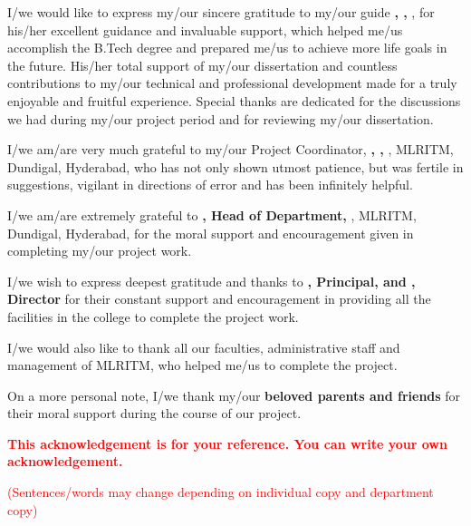 \begin{acknowledgment}
    I/we would like to express my/our sincere gratitude to my/our guide 
    \textbf{\guide, \guideDesignation, \deptName}, for his/her excellent guidance and invaluable support, which helped me/us accomplish the B.Tech degree and prepared me/us to achieve more life goals in the future. His/her total support of my/our dissertation and countless contributions to my/our technical and professional development made for a truly enjoyable and fruitful experience. Special thanks are dedicated for the discussions we had during my/our project period and for reviewing my/our dissertation.
    
    I/we am/are very much grateful to my/our Project Coordinator, 
    \textbf{\supervisor, \supervisorDesignation, \deptName}, MLRITM, Dundigal, Hyderabad, who has not only shown utmost patience, but was fertile in suggestions, vigilant in directions of error and has been infinitely helpful.
    
    I/we am/are extremely grateful to 
    \textbf{\hod, Head of Department, \deptName}, MLRITM, Dundigal, Hyderabad, for the moral support and encouragement given in completing my/our project work.
    
    I/we wish to express deepest gratitude and thanks to 
    \textbf{\principal, Principal, and \director, Director} for their constant support and encouragement in providing all the facilities in the college to complete the project work.
    
    I/we would also like to thank all our faculties, administrative staff and management of MLRITM, who helped me/us to complete the project.
    
    On a more personal note, I/we thank my/our \textbf{beloved parents and friends} for their moral support during the course of our project.
    
    \vspace{20pt}
    
    \textcolor{red}{\textbf{This acknowledgement is for your reference. You can write your own acknowledgement.}} 
    
    \textcolor{red}{(Sentences/words may change depending on individual copy and department copy)}
\end{acknowledgment}
